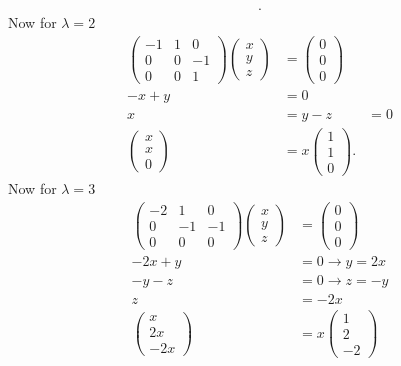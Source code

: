\begin{eg}
\begin{align*}
  .\end{align*}
  Now for $\lambda=2$
  \begin{align*}
    \begin{pmatrix} -1&1&0\\0&0&-1\\0&0&1 \end{pmatrix} \begin{pmatrix} x\\y\\z \end{pmatrix} &=\begin{pmatrix} 0\\0\\0 \end{pmatrix} \\
    -x+y&=0\\
    x&=y
    -z&=0\\
    \begin{pmatrix} x\\x\\0 \end{pmatrix} &=x\begin{pmatrix} 1\\1\\0 \end{pmatrix} 
  .\end{align*}
  Now for $\lambda=3$
  \begin{align*}
    \begin{pmatrix} -2&1&0\\0&-1&-1\\0&0&0 \end{pmatrix} \begin{pmatrix} x\\y\\z \end{pmatrix} &=\begin{pmatrix} 0\\0\\0 \end{pmatrix} \\
    -2x+y&=0\to y=2x\\
    -y-z&=0\to z=-y\\
    z&=-2x\\
    \begin{pmatrix} x\\2x\\-2x \end{pmatrix} &=x\begin{pmatrix} 1\\2\\-2 \end{pmatrix} 

\end{align*}
\end{eg}
